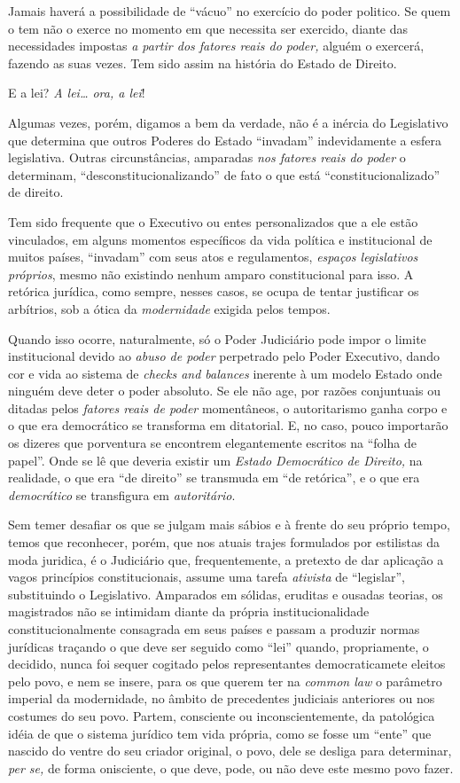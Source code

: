 Jamais haverá a possibilidade de ``vácuo'' no exercício do poder
politico. Se quem o tem não o exerce no momento em que necessita ser
exercido, diante das necessidades impostas \emph{a partir dos fatores
reais do poder,} alguém o exercerá, fazendo as suas vezes. Tem sido
assim na história do Estado de Direito.

E a lei? \emph{A lei\ldots{} ora, a lei}!

Algumas vezes, porém, digamos a bem da verdade, não é a inércia do
Legislativo que determina que outros Poderes do Estado
``invadam'' indevidamente a esfera legislativa. Outras
circunstâncias, amparadas \emph{nos fatores reais do poder} o
determinam, ``desconstitucionalizando'' de fato o que está
``constitucionalizado'' de direito.

Tem sido frequente que o Executivo ou entes personalizados que a ele
estão vinculados, em alguns momentos específicos da vida política e
institucional de muitos países, ``invadam'' com seus atos e
regulamentos, \emph{espaços legislativos próprios}, mesmo não existindo
nenhum amparo constitucional para isso. A retórica jurídica, como
sempre, nesses casos, se ocupa de tentar justificar os arbítrios, sob a
ótica da \emph{modernidade} exigida pelos tempos.

Quando isso ocorre, naturalmente, só o Poder Judiciário pode impor o
limite institucional devido ao \emph{abuso de poder} perpetrado pelo
Poder Executivo, dando cor e vida ao sistema de \emph{checks and
balances} inerente à um modelo Estado onde ninguém deve deter o poder
absoluto. Se ele não age, por razões conjuntuais ou ditadas pelos
\emph{fatores reais de poder} momentâneos, o autoritarismo ganha corpo e
o que era democrático se transforma em ditatorial. E, no caso, pouco
importarão os dizeres que porventura se encontrem elegantemente escritos
na ``folha de papel''. Onde se lê que deveria existir um
\emph{Estado Democrático de Direito,} na realidade, o que era ``de
direito'' se transmuda em ``de retórica'', e o que era
\emph{democrático} se transfigura em \emph{autoritário}.

Sem temer desafiar os que se julgam mais sábios e à frente do seu
próprio tempo, temos que reconhecer, porém, que nos atuais trajes
formulados por estilistas da moda juridica, é o Judiciário que,
frequentemente, a pretexto de dar aplicação a vagos princípios
constitucionais, assume uma tarefa \emph{ativista} de
``legislar'', substituindo o Legislativo. Amparados em sólidas,
eruditas e ousadas teorias, os magistrados não se intimidam diante da
própria institucionalidade constitucionalmente consagrada em seus países
e passam a produzir normas jurídicas traçando o que deve ser seguido
como ``lei'' quando, propriamente, o decidido, nunca foi sequer
cogitado pelos representantes democraticamete eleitos pelo povo, e nem
se insere, para os que querem ter na \emph{common law} o parâmetro
imperial da modernidade, no âmbito de precedentes judiciais anteriores
ou nos costumes do seu povo. Partem, consciente ou inconscientemente, da
patológica idéia de que o sistema jurídico tem vida própria, como se
fosse um ``ente'' que nascido do ventre do seu criador original,
o povo, dele se desliga para determinar, \emph{per se,} de forma
onisciente, o que deve, pode, ou não deve este mesmo povo fazer.

